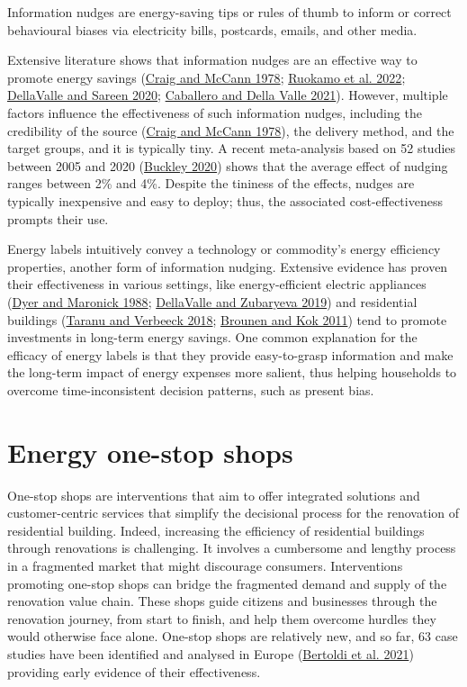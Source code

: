 \documentclass[
  12pt,
  captions=heading]{scrreport}
\begin{document}
Information nudges are energy-saving tips or rules of thumb to inform or
correct behavioural biases via electricity bills, postcards, emails, and
other media.

Extensive literature shows that information nudges are an effective way
to promote energy savings
(\protect\hyperlink{ref-craig1978assessing}{Craig and McCann 1978};
\protect\hyperlink{ref-ruokamo2022effect}{Ruokamo et al. 2022};
\protect\hyperlink{ref-dellavalle2020nudging}{DellaValle and Sareen
2020}; \protect\hyperlink{ref-caballero2021tackling}{Caballero and Della
Valle 2021}). However, multiple factors influence the effectiveness of
such information nudges, including the credibility of the source
(\protect\hyperlink{ref-craig1978assessing}{Craig and McCann 1978}), the
delivery method, and the target groups, and it is typically tiny. A
recent meta-analysis based on 52 studies between 2005 and 2020
(\protect\hyperlink{ref-buckley2020prices}{Buckley 2020}) shows that the
average effect of nudging ranges between 2\% and 4\%. Despite the
tininess of the effects, nudges are typically inexpensive and easy to
deploy; thus, the associated cost-effectiveness prompts their use.

Energy labels intuitively convey a technology or commodity's energy
efficiency properties, another form of information nudging. Extensive
evidence has proven their effectiveness in various settings, like
energy-efficient electric appliances
(\protect\hyperlink{ref-dyer1988evaluation}{Dyer and Maronick 1988};
\protect\hyperlink{ref-dellavalle2019can}{DellaValle and Zubaryeva
2019}) and residential buildings
(\protect\hyperlink{ref-taranu2018closer}{Taranu and Verbeeck 2018};
\protect\hyperlink{ref-brounen2011economics}{Brounen and Kok 2011}) tend
to promote investments in long-term energy savings. One common
explanation for the efficacy of energy labels is that they provide
easy-to-grasp information and make the long-term impact of energy
expenses more salient, thus helping households to overcome
time-inconsistent decision patterns, such as present bias.

\hypertarget{energy-one-stop-shops}{%
\section{Energy one-stop shops}\label{energy-one-stop-shops}}

One-stop shops are interventions that aim to offer integrated solutions
and customer-centric services that simplify the decisional process for
the renovation of residential building. Indeed, increasing the
efficiency of residential buildings through renovations is challenging.
It involves a cumbersome and lengthy process in a fragmented market that
might discourage consumers. Interventions promoting one-stop shops can
bridge the fragmented demand and supply of the renovation value chain.
These shops guide citizens and businesses through the renovation
journey, from start to finish, and help them overcome hurdles they would
otherwise face alone. One-stop shops are relatively new, and so far, 63
case studies have been identified and analysed in Europe
(\protect\hyperlink{ref-bertoldi2021role}{Bertoldi et al. 2021})
providing early evidence of their effectiveness.
\end{document}
